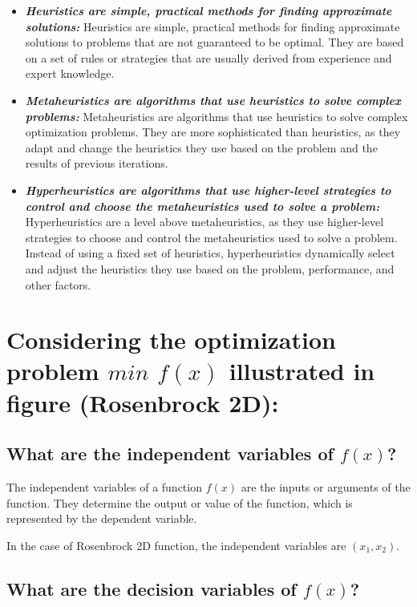 \documentclass[conference]{IEEEtran}
\begin{document}
\begin{itemize}
	\item \textbf{\textit{Heuristics are simple, practical methods for finding approximate solutions: }}Heuristics are simple, practical methods for finding approximate solutions to problems that are not guaranteed to be optimal. They are based on a set of rules or strategies that are usually derived from experience and expert knowledge.
	\item \textbf{\textit{Metaheuristics are algorithms that use heuristics to solve complex problems: }}Metaheuristics are algorithms that use heuristics to solve complex optimization problems. They are more sophisticated than heuristics, as they adapt and change the heuristics they use based on the problem and the results of previous iterations.
	\item \textbf{\textit{Hyperheuristics are algorithms that use higher-level strategies to control and choose the metaheuristics used to solve a problem: }} Hyperheuristics are a level above metaheuristics, as they use higher-level strategies to choose and control the metaheuristics used to solve a problem. Instead of using a fixed set of heuristics, hyperheuristics dynamically select and adjust the heuristics they use based on the problem, performance, and other factors.
	
\end{itemize}

\section{Considering the optimization problem $min$ $f(x)$ illustrated in figure (Rosenbrock 2D): }

\subsection{What are the independent variables of $f(x)$?}

The independent variables of a function $f(x)$ are the inputs or arguments of the function. They determine the output or value of the function, which is represented by the dependent variable. 

In the case of Rosenbrock 2D function, the independent variables are $(x_1, x_2)$.

\subsection{What are the decision variables of $f(x)$?}
\end{document}
